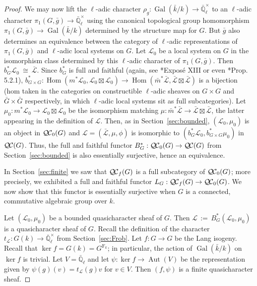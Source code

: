\documentclass[11pt]{amsart}
\theoremstyle{plain}
\theoremstyle{definition}
\theoremstyle{remark}
\newcommand{\EE}{\mathbb{\bar Q}_\ell}
\newcommand{\bFq}{\bar{k}}
\newcommand{\Fq}{k}
\newcommand{\EEx}{\EE^\times}
\DeclareMathOperator{\Gal}{Gal}
\newcommand{\Frob}[1]{{\operatorname{F}_{#1}}}
\DeclareMathOperator{\Aut}{Aut}
\DeclareMathOperator{\Hom}{Hom}
\newcommand{\ceq}{{\, :=\, }}
\newcommand{\iso}{{\ \cong\ }}
\newcommand{\cs}[1]{{\mathcal{#1}}}
\newcommand{\gcs}[1]{{\mathcal{\bar #1}}}
\newcommand{\QC}{{\mathcal{Q\hskip-0.8pt C}}}
\newcommand{\QCb}{{\QC_0}}
\newcommand{\QCf}{{\QC_f}}
\newcommand{\trFrob}[1]{t_{#1}}
\newcommand{\bg}{\bar{g}}
\begin{document}
\begin{proof}
  We may now lift the $\ell$-adic character $\rho_g : \Gal(\bFq/\Fq) \to \EEx$
  to an $\ell$-adic character $\pi_1(G,\bg) \to \EEx$ using the canonical topological group homomorphism
  $\pi_1(G,\bg) \to \Gal(\bFq/\Fq)$ determined by the structure map for $G$. But $\bg$ also
  determines an equivalence between the category of $\ell$-adic
  representations of $\pi_1(G,\bg)$ and $\ell$-adic local systems on $G$. Let
  $\cs{L}_0$ be a local system on $G$ in the isomorphism class
  determined by this $\ell$-adic character of $\pi_1(G,\bg)$.
  Then $b_G^*\cs{L}_0 \iso \gcs{L}$.
  Since $b_G^*$ is full and faithful (again, see \cite{SGA7.2}*{Expos\'e XIII} or even \cite{BBD}*{Prop. 5.2.1}),
  $
  b_{G\times G}^* : \Hom(m^*\cs{L}_0,\cs{L}_0\boxtimes\cs{L}_0) \to \Hom({\bar m}^*\gcs{L},\gcs{L}\boxtimes\gcs{L})
  $ 
  is a bijection 
  (hom taken in the categories on constructible $\ell$-adic sheaves on 
  $G\times G$ and ${\bar G}\times {\bar G}$ respectively, 
  in which $\ell$-adic local systems sit as full subcategories). 
  Let $\mu_0 : m^*\cs{L}_0 \to \cs{L}_0\boxtimes\cs{L}_0$ be the isomorphism matching 
  $\mu : {\bar m}^*\gcs{L} \to \gcs{L}\boxtimes\gcs{L}$, 
  the latter appearing in the definition of $\cs{L}$. 
  Then, as in Section~\ref{sec:bounded}, $(\cs{L}_0,\mu_0)$ is an object in $\QCb(G)$ 
  and $\cs{L} = (\gcs{L},\mu,\phi)$ is isomorphic to $(b_G^*\cs{L}_0,b_{G\times G}^*\mu_0)$ in $\QC(G)$.
  Thus, the full and faithful functor $B_G^* : \QCb(G) \to \QC(G)$ from Section~\ref{sec:bounded}
  is also essentially surjective, hence an equivalence.
  
  In Section~\ref{sec:finite} we saw that $\QCf(G)$ is a full subcategory of $\QCb(G)$;
  more precisely, we exhibited a full and faithful functor $L_G : \QCf(G) \to \QCb(G)$.
  We now show that this functor is essentially surjective 
  when $G$ is a connected, commutative algebraic group over $\Fq$.
  
  Let $(\cs{L}_0,\mu_0)$ be a bounded quasicharacter sheaf of $G$. 
  Then $\cs{L}\ceq B_G^*(\cs{L}_0,\mu_0)$ is a quasicharacter sheaf of $G$.
  Recall the definition of the character $\trFrob{\cs{L}} : G(\Fq) \to \EEx$ from Section~\ref{sec:Frob}. 
  Let $f : G\to G$ be the Lang isogeny.
  Recall that $\ker f = G(\Fq) = G^\Frob{\Fq}$; 
  in particular, the action of $\Gal(\bFq/\Fq)$ on $\ker f$ is trivial.
  Let $V = \EE$ and let $\psi : \ker f \to \Aut(V)$ be the representation given by 
  $\psi(g)(v) = \trFrob{\cs{L}}(g) v$ for $v\in V$. 
  Then $(f,\psi)$ is a finite quasicharacter sheaf. 
  

\end{proof}
\end{document}
